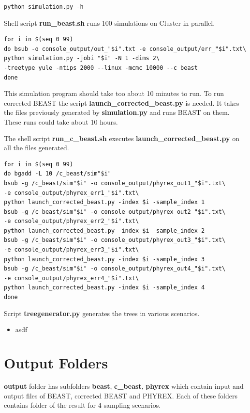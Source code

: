 \begin{verbatim}
python simulation.py -h
\end{verbatim}


Shell script \textbf{run\_beast.sh} runs 100 simulations on Cluster in parallel.
\begin{verbatim}
for i in $(seq 0 99)
do bsub -o console_output/out_"$i".txt -e console_output/err_"$i".txt\
python simulation.py -jobi "$i" -N 1 -dims 2\
-treetype yule -ntips 2000 --linux -mcmc 10000 --c_beast
done
\end{verbatim}


This simulation program should take too about 10 minutes to run. To run corrected BEAST the script \textbf{launch\_corrected\_beast.py} is needed. It takes the files previously generated by \textbf{simulation.py} and runs BEAST on them. These runs could take about 10 hours.

The shell script \textbf{run\_c\_beast.sh} executes \textbf{launch\_corrected\_beast.py} on all the files generated.
\begin{verbatim}
for i in $(seq 0 99)
do bgadd -L 10 /c_beast/sim"$i"
bsub -g /c_beast/sim"$i" -o console_output/phyrex_out1_"$i".txt\
-e console_output/phyrex_err1_"$i".txt\
python launch_corrected_beast.py -index $i -sample_index 1
bsub -g /c_beast/sim"$i" -o console_output/phyrex_out2_"$i".txt\
-e console_output/phyrex_err2_"$i".txt\
python launch_corrected_beast.py -index $i -sample_index 2
bsub -g /c_beast/sim"$i" -o console_output/phyrex_out3_"$i".txt\
-e console_output/phyrex_err3_"$i".txt\
python launch_corrected_beast.py -index $i -sample_index 3
bsub -g /c_beast/sim"$i" -o console_output/phyrex_out4_"$i".txt\
-e console_output/phyrex_err4_"$i".txt\
python launch_corrected_beast.py -index $i -sample_index 4
done
\end{verbatim}


Script \textbf{treegenerator.py} generates the trees in various scenarios.
\begin{itemize}
\item asdf
\end{itemize}


\section*{Output Folders}
\textbf{output} folder has subfolders 
\textbf{beast}, \textbf{c\_beast}, \textbf{phyrex} which contain input and output files of BEAST, corrected BEAST and PHYREX. Each of these folders contains folder of the result for 4 sampling scenarios.

